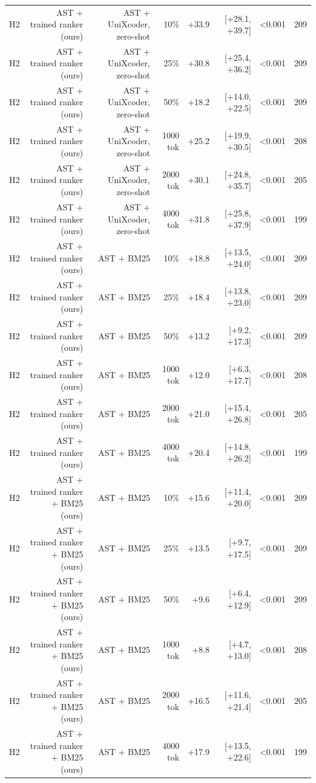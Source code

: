\begin{tabular}{lrrrrrrr}
H2 & AST + trained ranker (ours) & AST + UniXcoder, zero-shot & 10\% & +33.9 & [+28.1, +39.7] & <0.001 & 209 \\
H2 & AST + trained ranker (ours) & AST + UniXcoder, zero-shot & 25\% & +30.8 & [+25.4, +36.2] & <0.001 & 209 \\
H2 & AST + trained ranker (ours) & AST + UniXcoder, zero-shot & 50\% & +18.2 & [+14.0, +22.5] & <0.001 & 209 \\
H2 & AST + trained ranker (ours) & AST + UniXcoder, zero-shot & 1000 tok & +25.2 & [+19.9, +30.5] & <0.001 & 208 \\
H2 & AST + trained ranker (ours) & AST + UniXcoder, zero-shot & 2000 tok & +30.1 & [+24.8, +35.7] & <0.001 & 205 \\
H2 & AST + trained ranker (ours) & AST + UniXcoder, zero-shot & 4000 tok & +31.8 & [+25.8, +37.9] & <0.001 & 199 \\
H2 & AST + trained ranker (ours) & AST + BM25 & 10\% & +18.8 & [+13.5, +24.0] & <0.001 & 209 \\
H2 & AST + trained ranker (ours) & AST + BM25 & 25\% & +18.4 & [+13.8, +23.0] & <0.001 & 209 \\
H2 & AST + trained ranker (ours) & AST + BM25 & 50\% & +13.2 & [+9.2, +17.3] & <0.001 & 209 \\
H2 & AST + trained ranker (ours) & AST + BM25 & 1000 tok & +12.0 & [+6.3, +17.7] & <0.001 & 208 \\
H2 & AST + trained ranker (ours) & AST + BM25 & 2000 tok & +21.0 & [+15.4, +26.8] & <0.001 & 205 \\
H2 & AST + trained ranker (ours) & AST + BM25 & 4000 tok & +20.4 & [+14.8, +26.2] & <0.001 & 199 \\
H2 & AST + trained ranker + BM25 (ours) & AST + BM25 & 10\% & +15.6 & [+11.4, +20.0] & <0.001 & 209 \\
H2 & AST + trained ranker + BM25 (ours) & AST + BM25 & 25\% & +13.5 & [+9.7, +17.5] & <0.001 & 209 \\
H2 & AST + trained ranker + BM25 (ours) & AST + BM25 & 50\% & +9.6 & [+6.4, +12.9] & <0.001 & 209 \\
H2 & AST + trained ranker + BM25 (ours) & AST + BM25 & 1000 tok & +8.8 & [+4.7, +13.0] & <0.001 & 208 \\
H2 & AST + trained ranker + BM25 (ours) & AST + BM25 & 2000 tok & +16.5 & [+11.6, +21.4] & <0.001 & 205 \\
H2 & AST + trained ranker + BM25 (ours) & AST + BM25 & 4000 tok & +17.9 & [+13.5, +22.6] & <0.001 & 199 \\
\bottomrule
\end{tabular}
